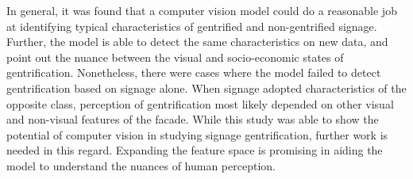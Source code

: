 In general, it was found that a computer vision model could do a reasonable job at identifying typical characteristics of gentrified and non-gentrified signage. Further, the model is able to detect the same characteristics on new data, and point out the nuance between the visual and socio-economic states of gentrification. Nonetheless, there were cases where the model failed to detect gentrification based on signage alone. When signage adopted characteristics of the opposite class, perception of gentrification most likely depended on other visual and non-visual features of the facade. While this study was able to show the potential of computer vision in studying signage gentrification, further work is needed in this regard. Expanding the feature space is promising in aiding the model to understand the nuances of human perception.